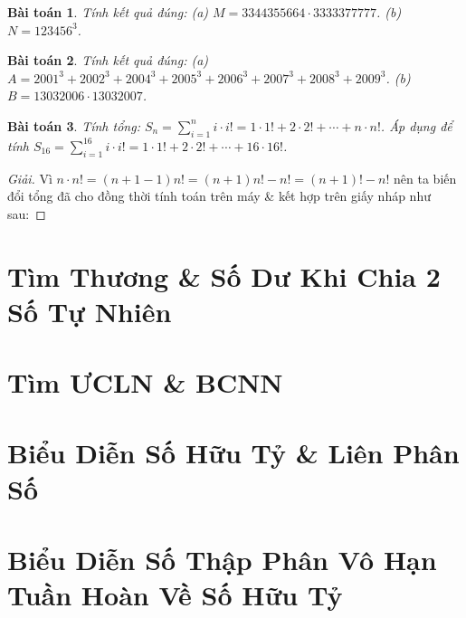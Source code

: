 \documentclass{article}
\newtheorem{baitoan}{Bài toán}
\begin{document}
\begin{baitoan}
	Tính kết quả đúng: (a) $M = 3344355664\cdot3333377777$. (b) $N = 123456^3$.
\end{baitoan}

\begin{baitoan}
	Tính kết quả đúng: (a) $A = 2001^3 + 2002^3 + 2004^3 + 2005^3 + 2006^3 + 2007^3 + 2008^3 + 2009^3$. (b) $B = 13032006\cdot13032007$.
\end{baitoan}

\begin{baitoan}
	Tính tổng: $S_n = \sum_{i=1}^n i\cdot i! = 1\cdot1! + 2\cdot2! + \cdots + n\cdot n!$. Áp dụng để tính $S_{16} = \sum_{i=1}^{16} i\cdot i! = 1\cdot1! + 2\cdot2! + \cdots + 16\cdot16!$.
\end{baitoan}

\begin{proof}[Giải]
	Vì $n\cdot n! = (n + 1 - 1)n! = (n + 1)n! - n! = (n + 1)! - n!$ nên ta biến đổi tổng đã cho đồng thời tính toán trên máy \& kết hợp trên giấy nháp như sau: 
\end{proof}




\section{Tìm Thương \& Số Dư Khi Chia 2 Số Tự Nhiên}


\section{Tìm ƯCLN \& BCNN}


\section{Biểu Diễn Số Hữu Tỷ \& Liên Phân Số}


\section{Biểu Diễn Số Thập Phân Vô Hạn Tuần Hoàn Về Số Hữu Tỷ}
\end{document}

